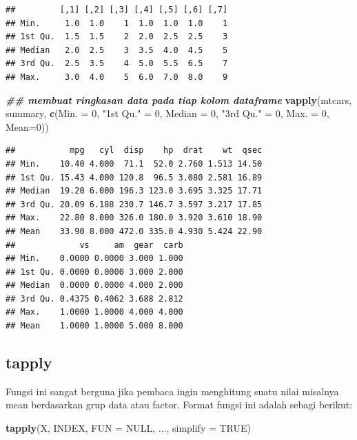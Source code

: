 \documentclass[
]{book}
\newenvironment{Shaded}{\begin{snugshade}}{\end{snugshade}}
\newcommand{\AttributeTok}[1]{\textcolor[rgb]{0.13,0.29,0.53}{#1}}
\newcommand{\ConstantTok}[1]{\textcolor[rgb]{0.56,0.35,0.01}{#1}}
\newcommand{\DecValTok}[1]{\textcolor[rgb]{0.00,0.00,0.81}{#1}}
\newcommand{\DocumentationTok}[1]{\textcolor[rgb]{0.56,0.35,0.01}{\textbf{\textit{#1}}}}
\newcommand{\FunctionTok}[1]{\textcolor[rgb]{0.13,0.29,0.53}{\textbf{#1}}}
\newcommand{\NormalTok}[1]{#1}
\newcommand{\OtherTok}[1]{\textcolor[rgb]{0.56,0.35,0.01}{#1}}
\newcommand{\StringTok}[1]{\textcolor[rgb]{0.31,0.60,0.02}{#1}}
\theoremstyle{definition}
\theoremstyle{definition}
\theoremstyle{definition}
\theoremstyle{definition}
\theoremstyle{remark}
\begin{document}
\begin{verbatim}
##         [,1] [,2] [,3] [,4] [,5] [,6] [,7]
## Min.     1.0  1.0    1  1.0  1.0  1.0    1
## 1st Qu.  1.5  1.5    2  2.0  2.5  2.5    3
## Median   2.0  2.5    3  3.5  4.0  4.5    5
## 3rd Qu.  2.5  3.5    4  5.0  5.5  6.5    7
## Max.     3.0  4.0    5  6.0  7.0  8.0    9
\end{verbatim}

\begin{Shaded}
\begin{Highlighting}[]
\DocumentationTok{\#\# membuat ringkasan data pada tiap kolom dataframe}
\FunctionTok{vapply}\NormalTok{(mtcars, summary,}
       \FunctionTok{c}\NormalTok{(}\AttributeTok{Min. =} \DecValTok{0}\NormalTok{, }\StringTok{"1st Qu."} \OtherTok{=} \DecValTok{0}\NormalTok{, }
         \AttributeTok{Median =} \DecValTok{0}\NormalTok{, }\StringTok{"3rd Qu."} \OtherTok{=} \DecValTok{0}\NormalTok{, }\AttributeTok{Max. =} \DecValTok{0}\NormalTok{, }\AttributeTok{Mean=}\DecValTok{0}\NormalTok{))}
\end{Highlighting}
\end{Shaded}

\begin{verbatim}
##           mpg   cyl  disp    hp  drat    wt  qsec
## Min.    10.40 4.000  71.1  52.0 2.760 1.513 14.50
## 1st Qu. 15.43 4.000 120.8  96.5 3.080 2.581 16.89
## Median  19.20 6.000 196.3 123.0 3.695 3.325 17.71
## 3rd Qu. 20.09 6.188 230.7 146.7 3.597 3.217 17.85
## Max.    22.80 8.000 326.0 180.0 3.920 3.610 18.90
## Mean    33.90 8.000 472.0 335.0 4.930 5.424 22.90
##             vs     am  gear  carb
## Min.    0.0000 0.0000 3.000 1.000
## 1st Qu. 0.0000 0.0000 3.000 2.000
## Median  0.0000 0.0000 4.000 2.000
## 3rd Qu. 0.4375 0.4062 3.688 2.812
## Max.    1.0000 1.0000 4.000 4.000
## Mean    1.0000 1.0000 5.000 8.000
\end{verbatim}

\hypertarget{tapply}{%
\subsection{tapply}\label{tapply}}

Fungsi ini sangat berguna jika pembaca ingin menghitung suatu nilai misalnya mean berdasarkan grup data atau factor. Format fungsi ini adalah sebagi berikut:

\begin{Shaded}
\begin{Highlighting}[]
\FunctionTok{tapply}\NormalTok{(X, INDEX, }\AttributeTok{FUN =} \ConstantTok{NULL}\NormalTok{, ..., }\AttributeTok{simplify =} \ConstantTok{TRUE}\NormalTok{)}
\end{Highlighting}
\end{Shaded}
\end{document}
